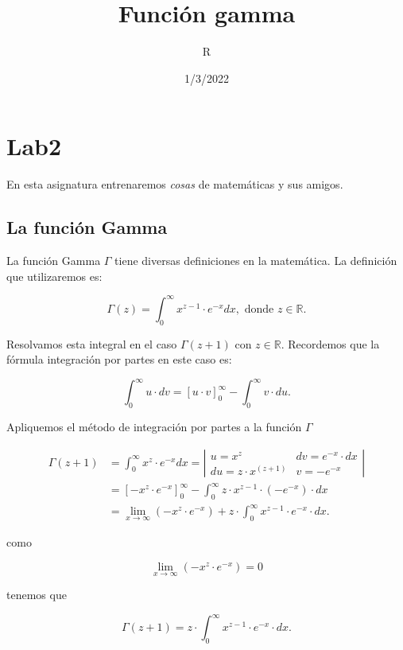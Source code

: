 \documentclass[
]{article}
\title{Función gamma}
\author{R}
\date{1/3/2022}
\begin{document}
\maketitle

{
\hypersetup{linkcolor=blue}
\setcounter{tocdepth}{2}
\tableofcontents
}
\hypertarget{lab2}{%
\section{Lab2}\label{lab2}}

En esta asignatura entrenaremos \emph{cosas} de matemáticas y sus
amigos.

\hypertarget{la-funciuxf3n-gamma}{%
\subsection{La función Gamma}\label{la-funciuxf3n-gamma}}

La función Gamma \(\Gamma\) tiene diversas definiciones en la
matemática. La definición que utilizaremos es:

\[ \Gamma(z)= \int_0^{\infty} x^{z-1} \cdot e^{-x}dx, \mbox{ donde } z\in \mathbb{R}.\]

Resolvamos esta integral en el caso \(\Gamma(z+1)\) con
\(z\in \mathbb{R}\). Recordemos que la fórmula integración por partes en
este caso es:

\[\int_{0}^{\infty} u \cdot d v =\left[u\cdot v \right]_0^\infty-\int_0^{\infty} v \cdot du.\]

Apliquemos el método de integración por partes a la función \(\Gamma\)

\[
\begin{aligned}
\Gamma(z+1) &=  \int_0^{\infty} x^{z} \cdot e^{-x}dx= 
\left|
\begin{matrix} u=x^{z}  & dv= e^{-x}\cdot  dx 
\\ du= z \cdot x^(z+1)  & v=-e^{-x} 
\end{matrix}
\right|
\\
&=\left[-x^z\cdot e^{-x}\right]_0^\infty
-\int_0^{\infty} z\cdot x^{z-1} \cdot \left(-e^{-x}\right)\cdot  dx
\\
&=
\lim_{x\to\infty}\left(-x^z\cdot e^{-x}\right)
+
z\cdot \int_0^{\infty} x^{z-1} \cdot e^{-x}\cdot dx.
\end{aligned}
\]

como

\[\lim_{x\to\infty}\left(-x^z\cdot e^{-x}\right)=0\]

tenemos que

\[\Gamma(z+1)= 
z\cdot \int_0^{\infty} x^{z-1} \cdot e^{-x}\cdot  dx.
\]
\end{document}
